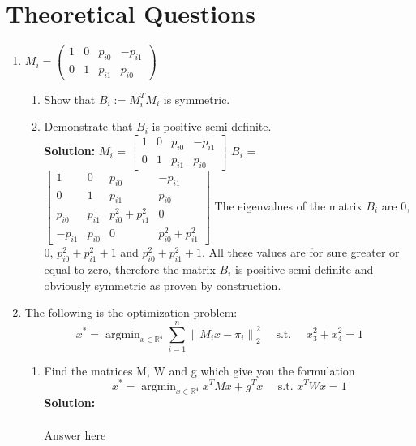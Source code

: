 \documentclass{article}
\numberwithin{equation}{section}
\newcommand{\0}{\mathbf{0}}
\begin{document}
	 \section{Theoretical Questions}
	 \begin{enumerate}
	 	\item $M_{i}=\left(\begin{array}{cccc}{1} & {0} & {p_{i 0}} & {-p_{i 1}} \\ {0} & {1} & {p_{i 1}} & {p_{i 0}}\end{array}\right)$
 		\begin{enumerate}
 		\item Show that $B_{i} :=M_{i}^{T} M_{i}$ is symmetric. \\
 		\item Demonstrate that $B_{i}$ is positive semi-definite. \\
 		\newline{}
         \textbf{Solution:}
         \newline{}
         \newline{}
         $M_i$ = 
         $\begin{bmatrix} 
            1 & 0 & p_{i0} & -p_{i1}\\
            0 & 1 & p_{i1} & p_{i0}
        \end{bmatrix}$
        \newline{}
        $B_i$ = 
        $\begin{bmatrix} 
            1 & 0 & p_{i0} & -p_{i1}\\
            0 & 1 & p_{i1} & p_{i0}\\
            p_{i0} & p_{i1} & p_{i0}^2 + p_{i1}^2 & 0\\
            -p_{i1} & p_{i0} & 0 & p_{i0}^2 + p_{i1}^2
        \end{bmatrix}$
        \newline{}
        \newline{}
        The eigenvalues of the matrix $B_i$ are $0$, $0$, $p_{i0}^2 + p_{i1}^2 + 1$ and $p_{i0}^2 + p_{i1}^2 + 1$. All these values are for sure greater or equal to zero, therefore the matrix $B_i$ is positive semi-definite and obviously symmetric as proven by construction.	
 		
	 	\end{enumerate}
 		
 		\item The following is the optimization problem:
 		\[ 
 		x^{*}=\operatorname{argmin}_{x \in \mathbb{R}^{4}} \sum_{i=1}^{n}\left\|M_{i} x-\pi_{i}\right\|_{2}^{2} \quad \text { s.t. } \quad x_{3}^{2}+x_{4}^{2}=1
 		\] 
 		\begin{enumerate}
		\item Find the matrices M, W and g which give you the formulation 
		\[
		 x^{*}=\operatorname{argmin}_{x \in \mathbb{R}^{4}} x^{T} M x+g^{T} x 
		\quad \text { s.t. } x^{T} W x=1
		\]
 		\textbf{Solution:}
		\\
		\\
		Answer here
		\\
		\\		
		

\end{enumerate}
\end{enumerate}
\end{document}
